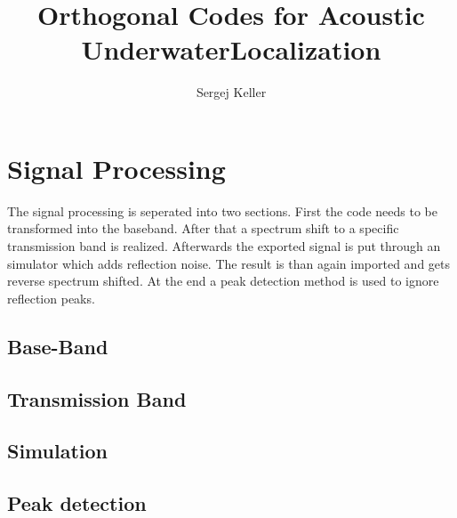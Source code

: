 \documentclass[en,abstract,acknowledgment,symbollist,inputenc=utf8]{tuhhthesis}
\author{Sergej Keller}
\title{Orthogonal Codes for Acoustic UnderwaterLocalization}
\institute{InstAutonomousCPS}
\begin{document}



\chapter{Signal Processing}
The signal processing is seperated into two sections. First the code needs to be transformed into the baseband. After that a spectrum shift to a specific transmission band is realized. Afterwards the exported signal is put through an simulator which adds reflection noise. The result is than again imported and gets reverse spectrum shifted. At the end a peak detection method is used to ignore reflection peaks.
\section{Base-Band}
\section{Transmission Band}
\section{Simulation}
\section{Peak detection}

%
%
%
%
%




\begin{tuhhappendix}
  
\end{tuhhappendix}


\end{document}
